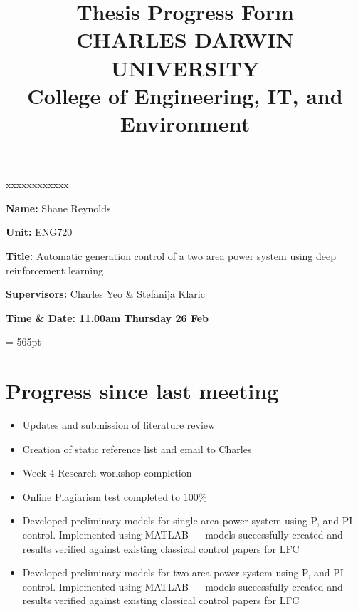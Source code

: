 \documentclass[12pt]{article}
\title{	
		Thesis Progress Form\\
		CHARLES DARWIN UNIVERSITY\\
		College of Engineering, IT, and Environment
	  }
\author{}
\date{}
\begin{document}
	
	\maketitle
	
	\begin{namelist}{xxxxxxxxxxxx}
		\item[{\bf Name:}]
			Shane Reynolds
		\item[{\bf Unit:}]
			ENG720
		\item[{\bf Title:}]
			Automatic generation control of a two area power system using deep reinforcement learning
		\item[{\bf Supervisors:}]
			Charles Yeo \& Stefanija Klaric
		\item[{\bf Time \& Date: 11.00am Thursday 26 Feb}]
			
	\end{namelist}
	
	\pagestyle{plain} %
	\textheight = 565pt %
	
	\section{Progress since last meeting}
	\begin{itemize}
		\item Updates and submission of literature review
		\item Creation of static reference list and email to Charles
		\item Week 4 Research workshop completion
		\item Online Plagiarism test completed to 100\%
		\item Developed preliminary models for single area power system using P, and PI control. Implemented using MATLAB --- models successfully created and results verified against existing classical control papers for LFC
		\item Developed preliminary models for two area power system using P, and PI control. Implemented using MATLAB --- models successfully created and results verified against existing classical control papers for LFC
	\end{itemize}
\end{document}
